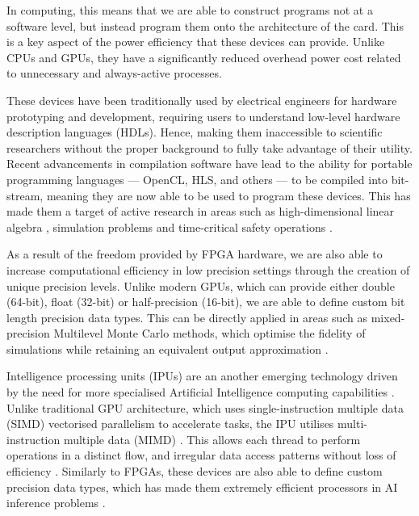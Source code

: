 In computing, this means that we are able to construct programs not at a software level, but instead program them onto the architecture of the card. This is a key aspect of the power efficiency that these devices can provide. Unlike CPUs and GPUs, they have a significantly reduced overhead power cost related to unnecessary and always-active processes. 

These devices have been traditionally used by electrical engineers for hardware prototyping and development, requiring users to understand low-level hardware description languages (HDLs). Hence, making them inaccessible to scientific researchers without the proper background to fully take advantage of their utility. Recent advancements in compilation software have lead to the ability for portable programming languages --- OpenCL, HLS, and others --- to be compiled into bit-stream, meaning they are now able to be used to program these devices. This has made them a target of active research in areas such as high-dimensional linear algebra \cite{warneComparisonHighLevel2014,ComparingEnergyEfficiency, macintoshImplementationParallelTridiagonal2016, macintoshImplementingEvaluatingHeterogeneous2019, warneSolvingTriDiagonalLinear}, simulation problems \cite{banksCALCULATIONENGINEPARAMETERS2014} and time-critical safety operations \cite{warnePulsecoupledNeuralNetwork2014}.

As a result of the freedom provided by FPGA hardware, we are also able to increase computational efficiency in low precision settings through the creation of unique precision levels. Unlike modern GPUs, which can provide either double (64-bit), float (32-bit) or half-precision (16-bit), we are able to define custom bit length precision data types. This can be directly applied in areas such as mixed-precision Multilevel Monte Carlo methods, which optimise the fidelity of simulations while retaining an equivalent output approximation \cite{haasNestedMLMCFramework2025}.

Intelligence processing units (IPUs) are an another emerging technology driven by the need for more specialised Artificial Intelligence computing capabilities \cite{kulkarniAcceleratingSimulationbasedInference2020}. Unlike traditional GPU architecture, which uses single-instruction multiple data (SIMD) vectorised parallelism to accelerate tasks, the IPU utilises multi-instruction multiple data (MIMD) \cite{jiaDissectingGraphcoreIPU2019}. This allows each thread to perform operations in a distinct flow, and irregular data access patterns without loss of efficiency \cite{jiaDissectingGraphcoreIPU2019}. Similarly to FPGAs, these devices are also able to define custom precision data types, which has made them extremely efficient processors in AI inference problems \cite{fitzgibbonStochasticRoundingFew2025,sunIntelligenceProcessingUnits2022,MixedPrecisionArithmeticAI}.

